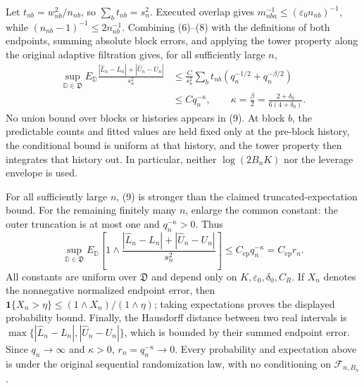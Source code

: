 Let \(t_{nb}=w_{nb}^2/n_{nb}\), so \(\sum_bt_{nb}=s_n^2\). Executed overlap gives \(m_{nba}^{-1}\le(\varepsilon_0n_{nb})^{-1}\), while \((n_{nb}-1)^{-1}\le2n_{nb}^{-1}\). Combining (6)--(8) with the definitions of both endpoints, summing absolute block errors, and applying the tower property along the original adaptive filtration gives, for all sufficiently large \(n\),
\[
 \begin{aligned}
 \sup_{\mathbb D\in\mathfrak D}
 E_{\mathbb D}\frac{|\widehat L_n-L_n|+|\widehat U_n-U_n|}{s_n^2}
 &\le \frac{C}{s_n^2}\sum_bt_{nb}
 \left(q_n^{-1/2}+q_n^{-\beta/2}\right)\\
 &\le Cq_n^{-\kappa},
 \qquad \kappa=\frac{\beta}{2}=\frac{2+\delta_0}{6(4+\delta_0)}.
 \end{aligned}\tag{9}
\]
No union bound over blocks or histories appears in (9). At block \(b\), the predictable counts and fitted values are held fixed only at the pre-block history, the conditional bound is uniform at that history, and the tower property then integrates that history out. In particular, neither \(\log(2B_nK)\) nor the leverage envelope is used.

For all sufficiently large \(n\), (9) is stronger than the claimed truncated-expectation bound. For the remaining finitely many \(n\), enlarge the common constant: the outer truncation is at most one and \(q_n^{-\kappa}>0\). Thus
\[
 \sup_{\mathbb D\in\mathfrak D}E_{\mathbb D}\left[1\wedge
 \frac{|\widehat L_n-L_n|+|\widehat U_n-U_n|}{s_n^2}\right]
 \le C_{\mathrm{ep}}q_n^{-\kappa}=C_{\mathrm{ep}}r_n.
\]
All constants are uniform over \(\mathfrak D\) and depend only on \(K,\varepsilon_0,\delta_0,C_R\). If \(X_n\) denotes the nonnegative normalized endpoint error, then
\(\mathbf 1\{X_n>\eta\}\le(1\wedge X_n)/(1\wedge\eta)\); taking expectations proves the displayed probability bound. Finally, the Hausdorff distance between two real intervals is \(\max\{|\widehat L_n-L_n|,|\widehat U_n-U_n|\}\), which is bounded by their summed endpoint error. Since \(q_n\to\infty\) and \(\kappa>0\), \(r_n=q_n^{-\kappa}\to0\). Every probability and expectation above is under the original sequential randomization law, with no conditioning on \(\mathcal F_{n,B_n}\).